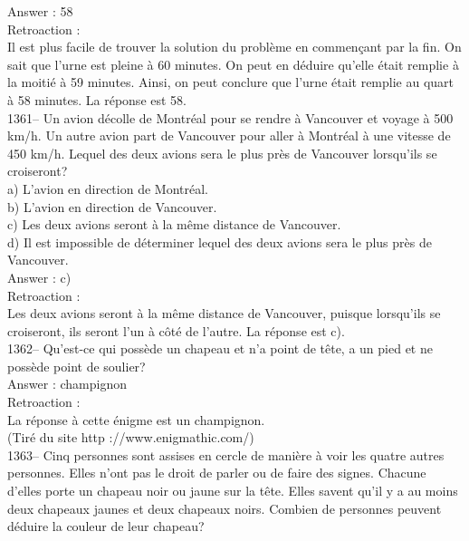 ﻿\documentclass[letterpaper, 12pt]{article}
\begin{document}
Answer : 58\\

Retroaction : \\
Il est plus facile de trouver la solution du probl\`eme en commen\c cant par
la fin.  On sait que l'urne est pleine \`a 60 minutes.  On peut en d\'eduire
qu'elle \'etait remplie \`a la moiti\'e \`a 59 minutes.  Ainsi, on peut
conclure que l'urne \'etait remplie au quart \`a 58 minutes.  La r\'eponse
est 58.\\

1361-- Un avion d\'ecolle de Montr\'eal pour se rendre \`a Vancouver et
voyage \`a 500 km/h.  Un autre avion part de Vancouver pour aller \`a
Montr\'eal \`a une vitesse de 450 km/h.  Lequel des deux avions sera le plus
pr\`es de Vancouver lorsqu'ils se croiseront?\\
a) L'avion en direction de Montr\'eal.\\
b) L'avion en direction de Vancouver.\\
c) Les deux avions seront \`a la m\^eme distance de Vancouver.\\
d) Il est impossible de d\'eterminer lequel des deux avions sera le plus
pr\`es de Vancouver.\\

Answer : c)\\

Retroaction : \\
Les deux avions seront \`a la m\^eme distance de Vancouver, puisque
lorsqu'ils se croiseront, ils seront l'un \`a c\^ot\'e de l'autre.  La
r\'eponse est c).\\



1362-- Qu'est-ce qui poss\`ede un chapeau et n'a point de t\^ete, a un pied
et ne poss\`ede point de soulier?\\

Answer : champignon\\

Retroaction : \\
La r\'eponse \`a cette \'enigme est un champignon.\\
(Tir\'e du site http ://www.enigmathic.com/)\\





1363-- Cinq personnes sont assises en cercle de mani\`ere \`a voir les
quatre autres personnes.  Elles n'ont pas le droit de parler ou de faire des
signes.  Chacune d'elles porte un chapeau noir ou jaune sur la t\^ete.
Elles savent qu'il y a au moins deux chapeaux jaunes et deux chapeaux noirs.
  Combien de personnes peuvent d\'eduire la couleur de leur chapeau?\\
\end{document}
